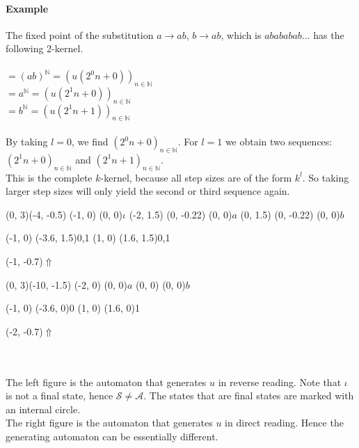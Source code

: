 \documentclass{article}
\begin{document}
\paragraph{Example}
The fixed point of the substitution $a \to ab$, $b \to ab$,
which is $abababab\ldots$ has the following 2-kernel.\\
\\
$= (ab)^\mathbb{N} = (u(2^0 n + 0))_{n \in \mathbb{N}}$\\
$= a^\mathbb{N} = (u(2^1 n + 0))_{n \in \mathbb{N}}$\\
$= b^\mathbb{N} = (u(2^1 n + 1))_{n \in \mathbb{N}}$\\
\\
By taking $l = 0$, we find $(2^0 n + 0)_{n \in \mathbb{N}}$. For $l = 1$ we
obtain two sequences: $(2^1 n + 0)_{n \in \mathbb{N}}$ and
$(2^1 n + 1)_{n \in \mathbb{N}}$.\\
This is the complete $k$-kernel, because all step sizes are of the form
$k^l$. So taking larger step sizes will only yield the second or third
sequence again.\\
\begin{graph}(0, 3)(-4, -0.5)
  (-1, 0) (0, 0){$\iota$}
  (-2, 1.5)
    (0, -0.22){} (0, 0){$a$}
  (0, 1.5)
    (0, -0.22){} (0, 0){$b$}

   
   
  (-1, 0) \freetext(-3.6, 1.5){0,1}
  (1, 0) \freetext(1.6, 1.5){0,1}

  \freetext(-1, -0.7){$\Uparrow$}
\end{graph}
\begin{graph}(0, 3)(-10, -1.5)
  (-2, 0) (0, 0){$a$}
  (0, 0)  (0, 0){$b$}

  (-1, 0) \freetext(-3.6, 0){0}
   
   
  (1, 0) \freetext(1.6, 0){1}

  \freetext(-2, -0.7){$\Uparrow$}
\end{graph}\\
\\
The left figure is the automaton that generates $u$ in reverse reading. Note 
that $\iota$ is not a final state, hence $\mathcal{S} \ne \mathcal{A}$. The 
states that are final states are marked with an internal circle.\\
The right figure is the automaton that generates $u$ in direct reading. Hence
the generating automaton can be essentially different.
\end{document}
